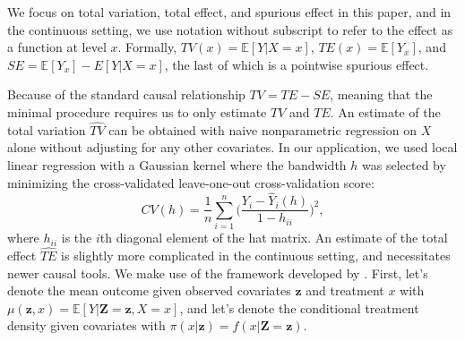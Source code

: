 \documentclass{article}
\theoremstyle{plain}
\theoremstyle{definition}
\theoremstyle{remark}
\begin{document}
We focus on total variation, total effect,
and spurious effect in this paper, and in the continuous setting, we use notation without subscript to refer to the effect as a function at level $x$. Formally, $TV(x) = \mathbb E[Y|X=x]$, $TE(x) = \mathbb E[Y_x]$, and $SE = \mathbb E[Y_x] - E[Y|X=x]$, the last of which is a pointwise
spurious effect.














Because of the standard causal relationship $TV = TE - SE$, 
meaning that the minimal procedure requires us to only estimate $TV$ and $TE$. An estimate of the total variation $\widehat {TV}$ can be obtained
with naive nonparametric regression on $X$ alone without adjusting for any other covariates. In our application, we used local linear regression with a Gaussian kernel where the bandwidth $h$ was selected by minimizing the cross-validated leave-one-out cross-validation score:
\begin{equation}
\label{eq:cv}
    CV(h)= \frac{1}{n}\sum_{i=1}^n\Big (\frac{Y_i-\hat Y_i(h)}{1-h_{ii}}\Big)^2,
\end{equation}
where $h_{ii}$ is the $i$th diagonal element of the hat matrix.
An estimate of the total effect $\widehat {TE}$ is slightly more complicated in the continuous setting, and necessitates newer causal tools. We make use of
the framework developed by \citet{kennedy2017non}. First,
let's denote the mean outcome given observed covariates $\mathbf z$ and treatment $x$ with $\mu(\mathbf z, x) = \mathbb E[Y|\mathbf Z =\mathbf z, X=x]$, and let's denote
the conditional treatment density given covariates 
with $\pi(x|\mathbf z)= f(x|\mathbf Z = \mathbf z)$.
\end{document}
